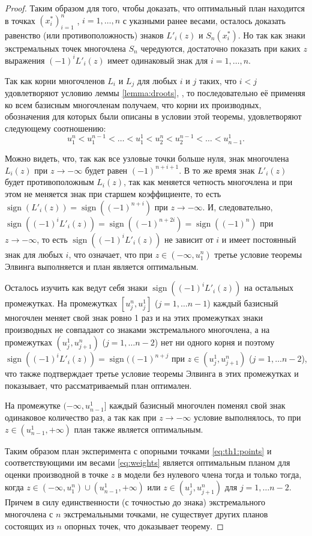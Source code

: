 \documentclass[specialist,
               substylefile = spbu.rtx,
               subf,href,colorlinks=true, 12pt]{disser}
\theoremstyle{definition}
\DeclareMathOperator*{\sign}{sign}
\begin{document}
\begin{proof}
	Таким образом для того, чтобы доказать, что оптимальный план находится в точках $(x_i^*)_{i=1}^n$ , $i = 1, \ldots, n$ с указными ранее весами, осталось доказать равенство (или противоположность) знаков $L'_i(z)$ и $ S_n(x_i^*)$. Но так как знаки экстремальных точек многочлена $S_n$ чередуются, достаточно показать при каких $z$ выражения $(-1)^i L'_i(z)$ имеет одинаковый знак для $i=1,\ldots , n$.
	
	Так как корни многочленов $L_i$ и $L_j$ для любых $i$ и $j$ таких, что $i < j$ удовлетворяют условию леммы \ref{lemma:droots}, , то последовательно её применяя ко всем базисным многочленам получаем, что корни их производных, обозначения для которых были описаны в условии этой теоремы, удовлетворяют следующему соотношению:
	\begin{equation*}
		u^n_1 < u^{n-1}_1 < \ldots < u^1_1 < u^n_2 < u^{n-1}_2 < \ldots < u_{n-1}^1.
	\end{equation*}
	
	Можно видеть, что, так как все узловые точки больше нуля, знак многочлена $L_i(z)$ при $z \to -\infty$ будет равен $(-1)^{n+i+1}$. В то же время знак $L'_i(z)$ будет противоположным $L_i(z)$, так как меняется четность многочлена и при этом не меняется знак при старшем коэффициенте, то есть $\sign(L'_i(z)) = \sign((-1)^{n+i})$ при $z \to -\infty$. И, следовательно, $\sign((-1)^i L'_i(z)) = \sign((-1)^{n+2i}) = \sign((-1)^{n})$ при $z \to -\infty$, то есть $\sign((-1)^i L'_i(z))$ не зависит от $i$ и имеет постоянный знак для любых $i$, что означает, что при $z \in (-\infty, u_1^n)$ третье условие теоремы Элвинга выполняется и план является оптимальным.
	
	Осталось изучить как ведут себя знаки $\sign((-1)^i L'_i(z))$ на остальных промежутках. На промежутках $[u_j^n, u_j^1]$ ($j = 1, \ldots {n-1}$) каждый базисный многочлен меняет свой знак ровно 1 раз и на этих промежутках знаки производных не совпадают со знаками экстремального многочлена, а на промежутках $(u_j^1, u_{j+1}^n)$ ($j=1, \ldots n-2$) нет ни одного корня и поэтому $\sign((-1)^i L'_i(z)) = \sign ((-1)^{n + j}$ при $z \in (u_j^1, u_{j+1}^n)$ ($j=1, \ldots n-2$), что также подтверждает третье условие теоремы Элвинга в этих промежутках и показывает, что рассматриваемый план оптимален.
	
	На промежутке $(-\infty, u_{n-1}^1]$ каждый базисный многочлен поменял свой знак одинаковое количество раз, а так как при $z \to -\infty$ условие выполнялось, то при $z \in (u_{n-1}^1, +\infty)$ план также является оптимальным.
	
	Таким образом план эксперимента с опорными точками \eqref{eq:th1:points} и соответствующими им весами \eqref{eq:weights} является оптимальным планом для оценки производной в точке $z$ в модели без нулевого члена тогда и только тогда, когда $z \in  (-\infty, u_1^n) \cup (u_{n-1}^1, +\infty)$ или $z \in (u_{j}^1, u_{j+1}^n)$ для $j=1, \ldots n-2$. Причем в силу единственности (с точностью до знака) экстремального многочлена с $n$ экстремальными точками, не существует других планов состоящих из $n$ опорных точек, что доказывает теорему.

	\end{proof}
	
\end{document}
